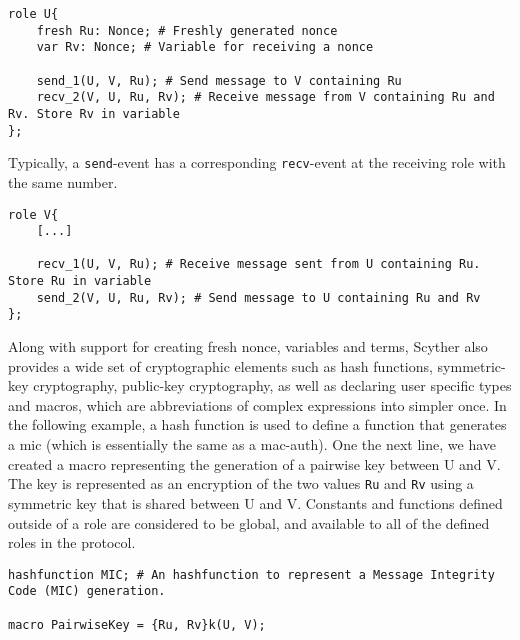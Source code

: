 \begin{lstlisting}
role U{
	fresh Ru: Nonce; # Freshly generated nonce
	var Rv: Nonce; # Variable for receiving a nonce
	
	send_1(U, V, Ru); # Send message to V containing Ru
	recv_2(V, U, Ru, Rv); # Receive message from V containing Ru and Rv. Store Rv in variable
};
\end{lstlisting}

Typically, a \texttt{send}-event has a corresponding \texttt{recv}-event at the receiving role with the same number.\newline

\begin{lstlisting}
role V{
	[...]
	
	recv_1(U, V, Ru); # Receive message sent from U containing Ru. Store Ru in variable
	send_2(V, U, Ru, Rv); # Send message to U containing Ru and Rv
};
\end{lstlisting}

Along with support for creating fresh nonce, variables and terms, Scyther also provides a wide set of cryptographic elements such as hash functions, symmetric-key cryptography, public-key cryptography, as well as declaring user specific types and macros, which are abbreviations of complex expressions into simpler once. In the following example, a hash function is used to define a function that generates a \gls{mic} (which is essentially the same as a \gls{mac-auth}). One the next line, we have created a macro representing the generation of a pairwise key between U and V. The key is represented as an encryption of the two values \texttt{Ru} and \texttt{Rv} using a symmetric key that is shared between U and V. Constants and functions defined outside of a role are considered to be global, and available to all of the defined roles in the protocol.\newline

\begin{lstlisting}
hashfunction MIC; # An hashfunction to represent a Message Integrity Code (MIC) generation.

macro PairwiseKey = {Ru, Rv}k(U, V);
\end{lstlisting}



